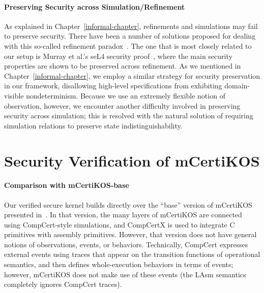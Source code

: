 \paragraph{Preserving Security across Simulation/Refinement}
As explained in Chapter~\ref{informal-chapter}, refinements
and simulations may fail to preserve security.  There have been a
number of solutions proposed for dealing with this so-called
refinement paradox~\cite{jurjens,morgan09,morgan12}.  The one that is
most closely related to our setup is Murray et al.'s seL4 security
proof~\cite{murray12,murray13}, where the main security properties are shown to
be preserved across refinement. As we mentioned in
Chapter~\ref{informal-chapter}, we employ a similar strategy for security
preservation in our framework, disallowing high-level specifications
from exhibiting domain-visible nondeterminism. Because we use an
extremely flexible notion of observation, however, we encounter
another difficulty involved in preserving security across simulation;
this is resolved with the natural solution of requiring simulation
relations to preserve state indistinguishability.

\section{Security Verification of mCertiKOS}
\label{related-certikos}

\paragraph{Comparison with mCertiKOS-base}
Our verified secure kernel builds directly over the ``base'' version of
mCertiKOS presented in~\cite{certikos-popl}. In that version, the
many layers of mCertiKOS are connected using CompCert-style
simulations, and CompCertX is used to integrate C primitives with
assembly primitives. However, that version does not have general
notions of observations, events, or behaviors. Technically, CompCert
expresses external events using traces that appear on the transition
functions of operational semantics, and then defines whole-execution
behaviors in terms of events; however, mCertiKOS does not make use of
these events (the LAsm semantics completely ignores CompCert traces).

